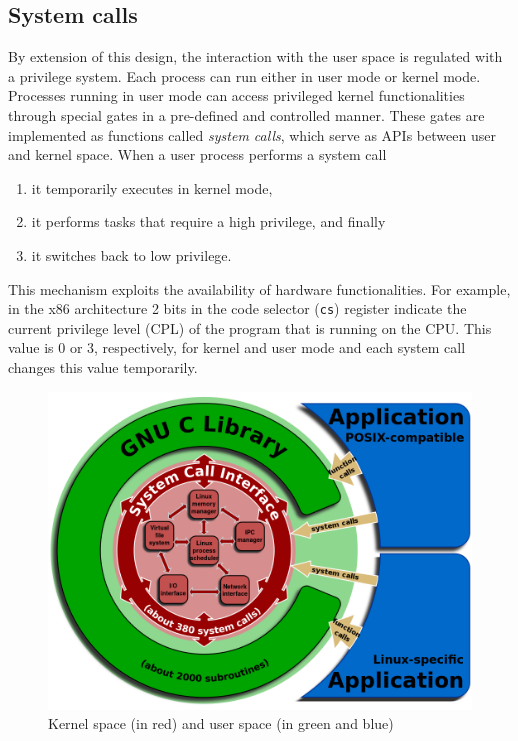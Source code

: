 \subsection{System calls}
By extension of this design, the interaction with the user space is regulated with a privilege system. Each process can run either in user mode or kernel mode. Processes running in user mode can access privileged kernel functionalities through special gates in a pre-defined and controlled manner. These gates are implemented as functions called \textit{system calls}, which serve as APIs between user and kernel space. When a user process performs a system call
\begin{enumerate}
    \item it temporarily executes in kernel mode, 
    \item it performs tasks that require a high privilege, and finally
    \item it switches back to low privilege.
\end{enumerate}
This mechanism exploits the availability of hardware functionalities.
For example, in the x86 architecture 2 bits in the code selector (\verb|cs|) register indicate the current privilege level (CPL) of the program that is running on the CPU. This value is 0 or 3, respectively, for kernel and user mode and each system call changes this value temporarily. 

\begin{figure}[ht]
  \centering
  \includegraphics[width=.75\textwidth]{images/userspace_kernelspace.png}
  \caption{Kernel space (in red) and user space (in green and blue)}
  \label{img:userspace_kernelspace}
\end{figure}

